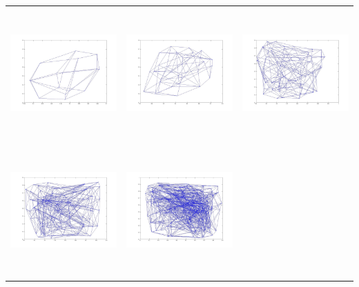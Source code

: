 \begin{tabular}{ |c|c|c| }
\includegraphics[width=5.0cm,height=5.0cm]{images/hypercube_4_Dimension.jpg}  &
\includegraphics[width=5.0cm,height=5.0cm]{images/hypercube_5_Dimension.jpg}   &
\includegraphics[width=5.0cm,height=5.0cm]{images/hypercube_6_Dimension.jpg}    \\
\includegraphics[width=5.0cm,height=5.0cm]{images/hypercube_7_Dimension.jpg}      &
\includegraphics[width=5.0cm,height=5.0cm]{images/hypercube_8_Dimension.jpg}       &

\end{tabular}
